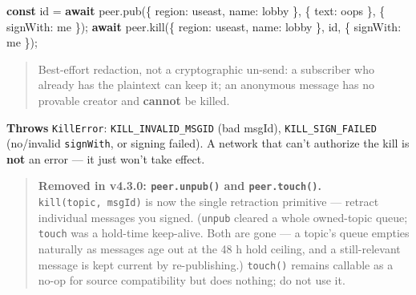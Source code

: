 \documentclass[
  nobib]{tufte-handout}
\newenvironment{Shaded}{}{}
\newcommand{\ControlFlowTok}[1]{\textcolor[rgb]{0.00,0.44,0.13}{\textbf{#1}}}
\newcommand{\DataTypeTok}[1]{\textcolor[rgb]{0.56,0.13,0.00}{#1}}
\newcommand{\FunctionTok}[1]{\textcolor[rgb]{0.02,0.16,0.49}{#1}}
\newcommand{\KeywordTok}[1]{\textcolor[rgb]{0.00,0.44,0.13}{\textbf{#1}}}
\newcommand{\NormalTok}[1]{#1}
\newcommand{\OperatorTok}[1]{\textcolor[rgb]{0.40,0.40,0.40}{#1}}
\newcommand{\StringTok}[1]{\textcolor[rgb]{0.25,0.44,0.63}{#1}}
\begin{document}
\begin{Shaded}
\begin{Highlighting}[]
\KeywordTok{const}\NormalTok{ id }\OperatorTok{=} \ControlFlowTok{await}\NormalTok{ peer}\OperatorTok{.}\FunctionTok{pub}\NormalTok{(\{ }\DataTypeTok{region}\OperatorTok{:} \StringTok{\textquotesingle{}useast\textquotesingle{}}\OperatorTok{,} \DataTypeTok{name}\OperatorTok{:} \StringTok{\textquotesingle{}lobby\textquotesingle{}}\NormalTok{ \}}\OperatorTok{,}\NormalTok{ \{ }\DataTypeTok{text}\OperatorTok{:} \StringTok{\textquotesingle{}oops\textquotesingle{}}\NormalTok{ \}}\OperatorTok{,}\NormalTok{ \{ }\DataTypeTok{signWith}\OperatorTok{:}\NormalTok{ me \})}\OperatorTok{;}
\ControlFlowTok{await}\NormalTok{ peer}\OperatorTok{.}\FunctionTok{kill}\NormalTok{(\{ }\DataTypeTok{region}\OperatorTok{:} \StringTok{\textquotesingle{}useast\textquotesingle{}}\OperatorTok{,} \DataTypeTok{name}\OperatorTok{:} \StringTok{\textquotesingle{}lobby\textquotesingle{}}\NormalTok{ \}}\OperatorTok{,}\NormalTok{ id}\OperatorTok{,}\NormalTok{ \{ }\DataTypeTok{signWith}\OperatorTok{:}\NormalTok{ me \})}\OperatorTok{;}
\end{Highlighting}
\end{Shaded}

\begin{quote}
Best-effort redaction, not a cryptographic un-send: a subscriber who
already has the plaintext can keep it; an anonymous message has no
provable creator and \textbf{cannot} be killed.
\end{quote}

\textbf{Throws} \texttt{KillError}: \texttt{KILL\_INVALID\_MSGID} (bad
msgId), \texttt{KILL\_SIGN\_FAILED} (no/invalid \texttt{signWith}, or
signing failed). A network that can't authorize the kill is \textbf{not}
an error --- it just won't take effect.

\begin{quote}
\textbf{Removed in v4.3.0: \texttt{peer.unpub()} and
\texttt{peer.touch()}.} \texttt{kill(topic,\ msgId)} is now the single
retraction primitive --- retract individual messages you signed.
(\texttt{unpub} cleared a whole owned-topic queue; \texttt{touch} was a
hold-time keep-alive. Both are gone --- a topic's queue empties
naturally as messages age out at the 48 h hold ceiling, and a
still-relevant message is kept current by re-publishing.)
\texttt{touch()} remains callable as a no-op for source compatibility
but does nothing; do not use it.
\end{quote}
\end{document}
